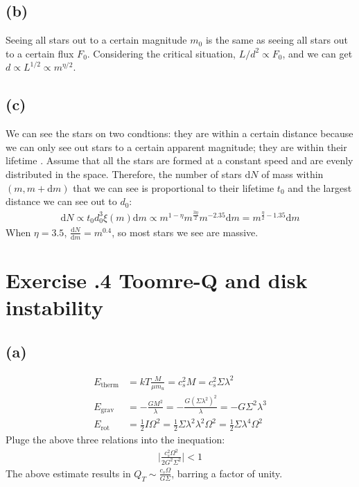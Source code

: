 \documentclass[a4paper,12pt]{article}
\renewcommand{\d}{\mathrm{d}}
\begin{document}
\subsection*{(b)}
Seeing all stars out to a certain magnitude $m_0$ is the same as 
seeing all stars out to a certain flux $F_0$. Considering the critical situation, 
$L/d^2 \propto F_0$, and we can get $d \propto L^{1/2} \propto m^{\eta/2}$.

\subsection*{(c)}
We can see the stars on two condtions: they are within a certain distance  because we can only see out 
stars to a certain apparent magnitude; they are within their lifetime . 
Assume that all the stars are formed at a constant speed and are evenly distributed in the space.
Therefore, the number of stars $\d N$ of mass within $(m, m+\d m)$ that we can see is proportional to 
their lifetime $t_0$ and the largest distance we can see out to $d_0$:
\begin{align*}
    \d N \propto t_0 d_0^3 \xi(m) \d m \propto m^{1-\eta} m^{\frac{3\eta}{2}} m^{-2.35} \d m = m^{\frac{\eta}{2}-1.35} \d m
\end{align*}
When $\eta=3.5$, $\frac{\d N}{\d m} = m^{0.4}$, so most stars we see are massive.

\section*{\textbf{Exercise \uppercase\expandafter{}.4 Toomre-Q and disk instability}}
\subsection*{(a)}
\begin{align*}
    E_{\text{therm}} &= kT \frac{M}{\mu m_u} = c_s^2 M = c_s^2 \Sigma \lambda^2 \\
    E_{\text{grav}} &= - \frac{G M^2}{\lambda} = - \frac{G (\Sigma \lambda^2)^2}{\lambda} = -G\Sigma^2 \lambda^3 \\
    E_{\text{rot}} &= \frac{1}{2} I \Omega^2 = \frac{1}{2} \Sigma \lambda^2 \lambda^2 \Omega^2 = \frac{1}{2} \Sigma \lambda^4 \Omega^2
\end{align*}
Pluge the above three relations into the inequation:
\begin{align*}
    \vert \frac{c_s^2 \Omega^2}{2 G^2 \Sigma^2} \vert < 1
\end{align*}
The above estimate results in $Q_T \sim \frac{c_s \Omega}{G \Sigma}$, barring a factor of unity.
\end{document}
